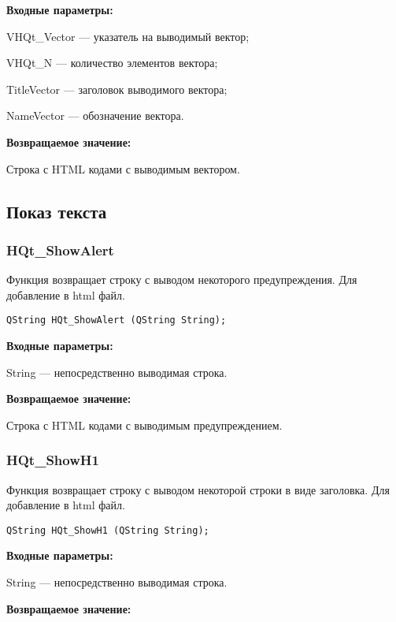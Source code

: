 \documentclass[a4paper,12pt]{article}
\begin{document}
\textbf{Входные параметры:}
 
    VHQt\_Vector --- указатель на выводимый вектор;
 
    VHQt\_N --- количество элементов вектора;
 
    TitleVector --- заголовок выводимого вектора;
 
    NameVector --- обозначение вектора.

\textbf{Возвращаемое значение:}

 
    Строка с HTML кодами с выводимым вектором.


\subsection{Показ текста}

\subsubsection{HQt\_ShowAlert}\label{HQt_ShowAlert}

Функция возвращает строку с выводом некоторого предупреждения. Для добавление в html файл.


\begin{lstlisting}[label=code_syntax_HQt_ShowAlert,caption=Синтаксис]
QString HQt_ShowAlert (QString String);
\end{lstlisting}

\textbf{Входные параметры:}

String --- непосредственно выводимая строка.

\textbf{Возвращаемое значение:}

Строка с HTML кодами с выводимым предупреждением.


\subsubsection{HQt\_ShowH1}\label{HQt_ShowH1}

Функция возвращает строку с выводом некоторой строки в виде заголовка. Для добавление в html файл.


\begin{lstlisting}[label=code_syntax_HQt_ShowH1,caption=Синтаксис]
QString HQt_ShowH1 (QString String);
\end{lstlisting}

\textbf{Входные параметры:}

String --- непосредственно выводимая строка.

\textbf{Возвращаемое значение:}
\end{document}
